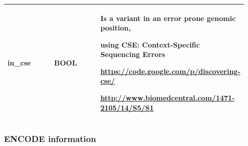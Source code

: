 \documentclass[letterpaper,10pt,english]{sphinxmanual}
\begin{document}
\begin{tabular}{|p{0.317\linewidth}|p{0.317\linewidth}|p{0.317\linewidth}|}
in\_cse
 & 
BOOL
 & 
\begin{DUlineblock}{0em}
\item[] Is a variant in an error prone genomic position,
\item[] using CSE: Context-Specific Sequencing Errors
\item[] \href{https://code.google.com/p/discovering-cse/}{https://code.google.com/p/discovering-cse/}
\item[] \href{http://www.biomedcentral.com/1471-2105/14/S5/S1}{http://www.biomedcentral.com/1471-2105/14/S5/S1}
\end{DUlineblock}
\\\hline
\end{tabular}



\subsubsection{ENCODE information}
\label{content/database_schema:encode-information}
\end{document}
